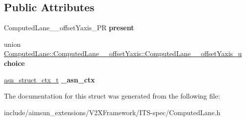 \subsection*{Public Attributes}
\begin{DoxyCompactItemize}
\item 
Computed\+Lane\+\_\+\+\_\+offset\+Yaxis\+\_\+\+PR {\bfseries present}\hypertarget{structComputedLane_1_1ComputedLane____offsetYaxis_a23c45f14fc0947c46ce80bfa06c99e42}{}\label{structComputedLane_1_1ComputedLane____offsetYaxis_a23c45f14fc0947c46ce80bfa06c99e42}

\item 
union \hyperlink{unionComputedLane_1_1ComputedLane____offsetYaxis_1_1ComputedLane____offsetYaxis__u}{Computed\+Lane\+::\+Computed\+Lane\+\_\+\+\_\+offset\+Yaxis\+::\+Computed\+Lane\+\_\+\+\_\+offset\+Yaxis\+\_\+u} {\bfseries choice}\hypertarget{structComputedLane_1_1ComputedLane____offsetYaxis_a045bf7c373361f52020225390809404c}{}\label{structComputedLane_1_1ComputedLane____offsetYaxis_a045bf7c373361f52020225390809404c}

\item 
\hyperlink{structasn__struct__ctx__s}{asn\+\_\+struct\+\_\+ctx\+\_\+t} {\bfseries \+\_\+asn\+\_\+ctx}\hypertarget{structComputedLane_1_1ComputedLane____offsetYaxis_a839809f017c8d6e5a0bf273e399a9bac}{}\label{structComputedLane_1_1ComputedLane____offsetYaxis_a839809f017c8d6e5a0bf273e399a9bac}

\end{DoxyCompactItemize}


The documentation for this struct was generated from the following file\+:\begin{DoxyCompactItemize}
\item 
include/aimsun\+\_\+extensions/\+V2\+X\+Framework/\+I\+T\+S-\/spec/Computed\+Lane.\+h\end{DoxyCompactItemize}
